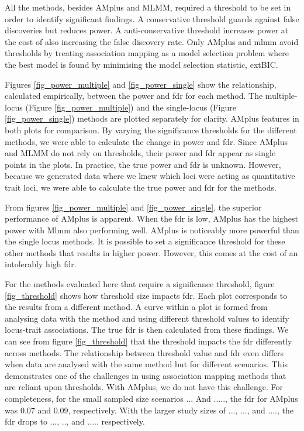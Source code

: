 \documentclass{nature}
\begin{document}
All the methods, besides AMplus and MLMM, required a threshold to be set in order to identify significant findings. 
A conservative threshold guards against false discoveries but reduces power. 
A anti-conservative threshold increases power at the cost of also increasing the false discovery rate. Only AMplus and mlmm avoid thresholds by treating association mapping as a model selection problem where the best model is found by minimising the model selection statistic, extBIC.

Figures \ref{fig_power_multiple}  and \ref{fig_power_single} show the relationship, calculated empirically, between the power and fdr for each method. The multiple-locus (Figure \ref{fig_power_multiple})   and the single-locus (Figure \ref{fig_power_single})  methods are plotted separately for clarity. 
AMplus features in both plots for comparison. By varying the significance thresholds for the different methods, we were able to calculate the change in power and fdr. Since AMplus and MLMM do not rely on thresholds, their power and fdr appear as single points in the plots. In practice, the true power and fdr is unknown. However, because we generated data where we knew which loci were acting as quantitative trait loci, we were able to calculate the true power and fdr for the methods.

From figures \ref{fig_power_multiple}  and \ref{fig_power_single}, the superior performance of AMplus is apparent. When the fdr is low, AMplus has the highest power with Mlmm also performing well. AMplus is noticeably more powerful than the single locus methods. 
It is possible to set a significance threshold for these other methods that results in higher power. 
However, this comes at the cost of an intolerably high fdr.

For the methods evaluated here that require a significance threshold, figure  \ref{fig_threshold}  shows how 
threshold size impacts fdr. Each plot corresponds to the results from a different method. 
A curve within a plot is formed from analysing data with the method and using different threshold values to identify locus-trait associations. 
The true fdr is then calculated from these findings.
We can see from figure \ref{fig_threshold}  that the threshold impacts the fdr differently across methods. The relationship between threshold value and fdr even differs when data are analysed with the same method but for different scenarios. This demonstrates one of the challenges in using association mapping methods that are reliant upon thresholds. With AMplus, we do not have this challenge. For completeness, for the small sampled size scenarios ... And ....., the fdr for AMplus was 0.07 and 0.09, respectively. With the larger study sizes of ..., ..., and ...., the fdr drops to ..., .., and ..... respectively.
\end{document}
